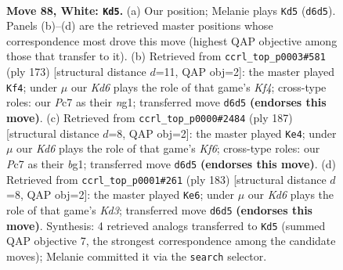 \documentclass[11pt]{article}
\begin{document}
\clearpage

\begin{figure}[p]\centering
\begin{subfigure}{0.46\textwidth}\centering
\resizebox{\linewidth}{!}{%
\newchessgame
\chessboard[
  setfen={6k1/2P5/3K4/4B3/8/8/8/8 w - - 1 88},
  showmover=false,
  pgfstyle=straightmove, color=movearrow, markmove={d6-d5}
]}
\caption{}
\end{subfigure}\hfill
\begin{subfigure}{0.46\textwidth}\centering
\resizebox{\linewidth}{!}{%
\newchessgame
\chessboard[
  setfen={8/8/8/5k2/4b2p/2K5/P7/6N1 b - - 3 87},
  showmover=false,
  pgfstyle=straightmove, color=movearrow, markmove={f5-f4}
]}
\caption{}
\end{subfigure}
\\[4pt]
\begin{subfigure}{0.46\textwidth}\centering
\resizebox{\linewidth}{!}{%
\newchessgame
\chessboard[
  setfen={8/8/8/3p4/6b1/5k2/3K2p1/6B1 b - - 3 94},
  showmover=false,
  pgfstyle=straightmove, color=movearrow, markmove={f3-e4}
]}
\caption{}
\end{subfigure}\hfill
\begin{subfigure}{0.46\textwidth}\centering
\resizebox{\linewidth}{!}{%
\newchessgame
\chessboard[
  setfen={8/4b3/3k4/2p5/8/3K2p1/6B1/8 b - - 55 92},
  showmover=false,
  pgfstyle=straightmove, color=movearrow, markmove={d6-e6}
]}
\caption{}
\end{subfigure}
\caption{\textbf{Move 88, White: \texttt{Kd5}.} (a) Our position; Melanie plays \texttt{Kd5} (\texttt{d6d5}). Panels (b)--(d) are the retrieved master positions whose correspondence most drove this move (highest QAP objective among those that transfer to it). (b) Retrieved from \texttt{ccrl\_top\_p0003\#581} (ply 173) [structural distance $d$=11, QAP obj=2]: the master played \texttt{Kf4}; under $\mu$ our \emph{Kd6} plays the role of that game's \emph{Kf4}; cross-type roles: our \emph{P}c7 as their \emph{n}g1; transferred move \texttt{d6d5} \textbf{(endorses this move)}. (c) Retrieved from \texttt{ccrl\_top\_p0000\#2484} (ply 187) [structural distance $d$=8, QAP obj=2]: the master played \texttt{Ke4}; under $\mu$ our \emph{Kd6} plays the role of that game's \emph{Kf6}; cross-type roles: our \emph{P}c7 as their \emph{b}g1; transferred move \texttt{d6d5} \textbf{(endorses this move)}. (d) Retrieved from \texttt{ccrl\_top\_p0001\#261} (ply 183) [structural distance $d$=8, QAP obj=2]: the master played \texttt{Ke6}; under $\mu$ our \emph{Kd6} plays the role of that game's \emph{Kd3}; transferred move \texttt{d6d5} \textbf{(endorses this move)}. Synthesis: 4 retrieved analogs transferred to \texttt{Kd5} (summed QAP objective 7, the strongest correspondence among the candidate moves); Melanie committed it via the \texttt{search} selector.}
\label{fig:thought-m174}
\end{figure}
\end{document}
